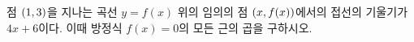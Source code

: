 점 $(1{,}\mkern3mu\mathopen{}3)$을 지나는 곡선 $y=f(x)$ 위의 임의의 점 $(x{,}\mkern3mu\mathopen{}f(x))$에서의 접선의 기울기가 $4x+6$이다. 이때 방정식 $f(x)=0$의 모든 근의 곱을 구하시오.
